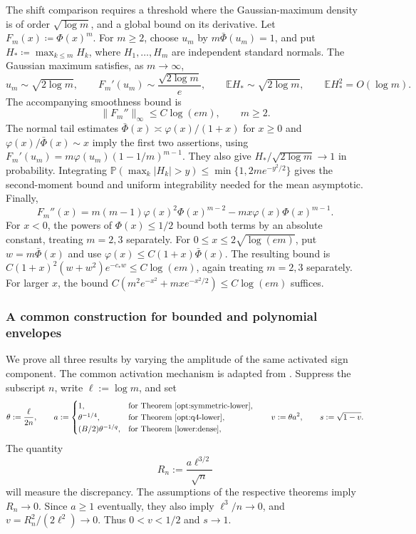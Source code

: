 \documentclass[11pt,letterpaper]{article}
\theoremstyle{remark}
\newcommand{\E}{\mathbb E}
\newcommand{\Pp}{\mathbb P}
\begin{document}
The shift comparison requires a threshold where the Gaussian-maximum
density is of order \(\sqrt{\log m}\), and a global bound on its
derivative. Let
\(F_m(x)\coloneqq\Phi(x)^m\). For \(m\ge2\), choose \(u_m\) by
\(m\bar\Phi(u_m)=1\), and put \(H_*\coloneqq\max_{k\le m}H_k\), where $H_1,\dots,H_m$ are independent standard normals. The Gaussian maximum satisfies, as \(m\to\infty\),
\begin{equation}
 u_m\sim\sqrt{2\log m},\qquad
 F_m'(u_m)\sim\frac{\sqrt{2\log m}}e,\qquad
 \E H_*\sim\sqrt{2\log m},\qquad \E H_*^2=O(\log m).
 \label{sym:eq:gaussian-max}
\end{equation}
The accompanying smoothness bound is
\begin{equation}
 \|F_m''\|_\infty\le C\log(em),\qquad m\ge2.
 \label{sym:eq:gaussian-smoothness}
\end{equation}
The normal tail estimates
\(\bar\Phi(x)\asymp\varphi(x)/(1+x)\) for \(x\ge0\) and
\(\varphi(x)/\bar\Phi(x)\sim x\) imply the first two assertions,
using \(F_m'(u_m)=m\varphi(u_m)(1-1/m)^{m-1}\).
They also give \(H_*/\sqrt{2\log m}\to1\) in probability.
Integrating \(\Pp(\max_k|H_k|>y)\le\min\{1,2me^{-y^2/2}\}\)
gives the second-moment bound and uniform integrability needed for
the mean asymptotic. Finally,
\[
 F_m''(x)=m(m-1)\varphi(x)^2\Phi(x)^{m-2}
             -mx\varphi(x)\Phi(x)^{m-1}.
\]
For \(x<0\), the powers of \(\Phi(x)\le1/2\) bound both terms
by an absolute constant, treating \(m=2,3\) separately. For
\(0\le x\le2\sqrt{\log(em)}\), put \(w=m\bar\Phi(x)\) and use
\(\varphi(x)\le C(1+x)\bar\Phi(x)\). The resulting bound is
\(C(1+x)^2(w+w^2)e^{-c_*w}\le C\log(em)\), again treating
\(m=2,3\) separately. For larger \(x\), the bound
\(C(m^2e^{-x^2}+mx e^{-x^2/2})\le C\log(em)\) suffices.

\subsubsection{A common construction for bounded and polynomial envelopes}

We prove all three results by varying the amplitude of the same activated sign component.
The common activation mechanism is adapted from
\cite[Proposition~E.1]{FKLZ}. Suppress the subscript \(n\), write
\(\ell:=\log m\), and set
\[
 \theta:=\frac{\ell}{2n},\qquad
 a:=\begin{cases}1,&\text{for Theorem~\ref{opt:symmetric-lower}},\\
                 \theta^{-1/4},&\text{for Theorem~\ref{opt:q4-lower}},\\
                 (B/2)\theta^{-1/q},&\text{for Theorem~\ref{lower:dense}},
    \end{cases}
 \qquad v:=\theta a^2,\qquad s:=\sqrt{1-v}.
\]
The quantity
\[
 R_n:=\frac{a\ell^{3/2}}{\sqrt n}
\]
will measure the discrepancy. The assumptions of the respective
theorems imply \(R_n\to0\). Since \(a\ge1\) eventually, they also
imply \(\ell^3/n\to0\), and
\(v=R_n^2/(2\ell^2)\to0\). Thus \(0<v<1/2\) and \(s\to1\).
\end{document}

